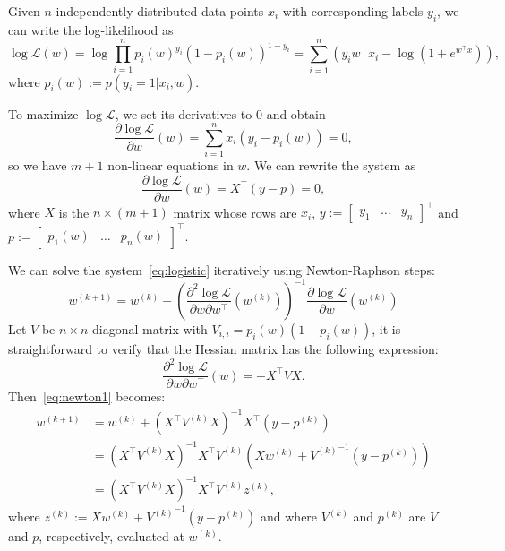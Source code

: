 \documentclass[notitlepage,oneside]{book}
\begin{document}
Given $n$ independently distributed data points $x_i$ with corresponding labels $y_i$, we can write the log-likelihood as
$$
\log \mathcal{L}(w) = \log \prod_{i=1}^n p_i(w)^{y_i}  (1-p_i(w))^{1-y_i} = \sum_{i=1}^n \left(y_i w^\top x_i - \log\left(1+e^{w^\top x}\right)\right),
$$
where $p_i(w):=p(y_i=1|x_i, w)$.

To maximize $\log\mathcal L$, we set its derivatives to 0 and obtain
$$
\frac{\partial\log\mathcal L}{\partial w}(w) = \sum_{i=1}^n x_i(y_i-p_i(w)) = 0,
$$
so we have $m+1$ non-linear equations in $w$. 
We can rewrite the system as
\begin{equation}
\frac{\partial\log\mathcal L}{\partial w}(w) = X^\top (y-p) = 0,
\label{eq:logistic}
\end{equation}
where $X$ is the $n\times (m+1)$ matrix whose rows are $x_i$, $y:=\begin{bmatrix}y_1 & \dots & y_n\end{bmatrix}^\top$ and $p:=\begin{bmatrix}p_1(w) & \dots & p_n(w)\end{bmatrix}^\top$.

We can solve the system~\eqref{eq:logistic} iteratively using Newton-Raphson steps:
\begin{equation}
w^{(k+1)} = w^{(k)} - \left(\frac{\partial^2 \log \mathcal L}{\partial w \partial w^\top}\left(w^{(k)}\right)\right)^{-1}\frac{\partial \log \mathcal L}{\partial w}\left(w^{(k)}\right)
\label{eq:newton1}
\end{equation}
Let $V$ be $n\times n$ diagonal matrix with $V_{i,i} = p_i(w)(1-p_i(w))$, it is straightforward to verify that the Hessian matrix has the following expression:
$$
\frac{\partial^2 \log \mathcal L}{\partial w \partial w^\top}\left(w\right) = -X^\top V X.
$$
Then~\eqref{eq:newton1} becomes:
\begin{equation}
\label{eq:newton2}
\begin{split}
w^{(k+1)} &= w^{(k)} + \left(X^\top V^{(k)} X\right)^{-1} X^\top (y - p^{(k)}) \\
          &= \left(X^\top V^{(k)} X\right)^{-1} X^\top V^{(k)} \left(X w^{(k)} + {V^{(k)}}^{-1} (y - p^{(k)})\right) \\
          &= \left(X^\top V^{(k)} X\right)^{-1} X^\top V^{(k)} z^{(k)},
\end{split}
\end{equation}
where $z^{(k)}:=Xw^{(k)} + {V^{(k)}}^{-1} (y - p^{(k)})$ and where $V^{(k)}$ and $p^{(k)}$ are $V$ and $p$, respectively, evaluated at $w^{(k)}$.
\end{document}
